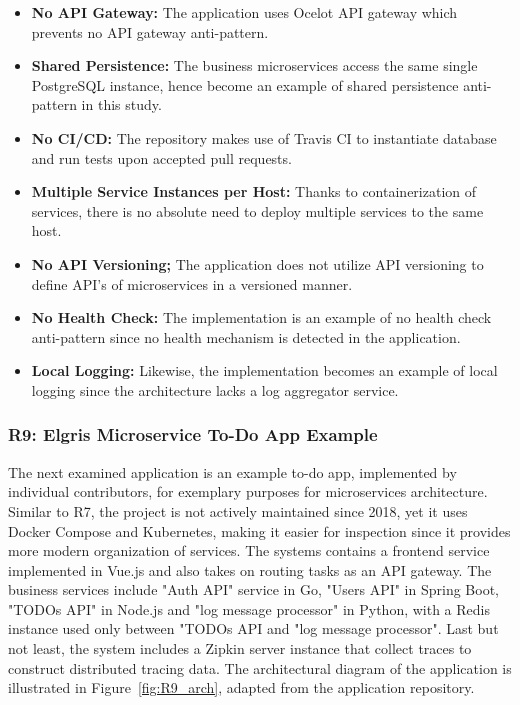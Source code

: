 \documentclass{Configuration_Files/PoliMi3i_thesis}
\begin{document}
\begin{itemize}
    \item \textbf{No API Gateway:} The application uses Ocelot API gateway which prevents no API gateway anti-pattern.
    
    \item \textbf{Shared Persistence:} The business microservices access the same single PostgreSQL instance, hence become an example of shared persistence anti-pattern in this study.
    
    \item \textbf{No CI/CD:} The repository makes use of Travis CI to instantiate database and run tests upon accepted pull requests.
    
    \item \textbf{Multiple Service Instances per Host:} Thanks to containerization of services, there is no absolute need to deploy multiple services to the same host.
    
    \item \textbf{No API Versioning;} The application does not utilize API versioning to define API's of microservices in a versioned manner.
    
    \item \textbf{No Health Check:} The implementation is an example of no health check anti-pattern since no health mechanism is detected in the application.
    
    \item \textbf{Local Logging:} Likewise, the implementation becomes an example of local logging since the architecture lacks a log aggregator service.
\end{itemize}

\subsubsection{R9: Elgris Microservice To-Do App Example}
\label{subsubsec:R9}

The next examined application is an example to-do app, implemented by individual contributors, for exemplary purposes for microservices architecture.
Similar to R7, the project is not actively maintained since 2018, yet it uses Docker Compose and Kubernetes, making it easier for inspection since it provides more modern organization of services.
The systems contains a frontend service implemented in Vue.js and also takes on routing tasks as an API gateway.
The business services include "Auth API" service in Go, "Users API" in Spring Boot, "TODOs API" in Node.js and "log message processor" in Python, with a Redis instance used only between "TODOs API and "log message processor".
Last but not least, the system includes a Zipkin server instance that collect traces to construct distributed tracing data.
The architectural diagram of the application is illustrated in Figure~\ref{fig:R9_arch}, adapted from the application repository.
\end{document}
